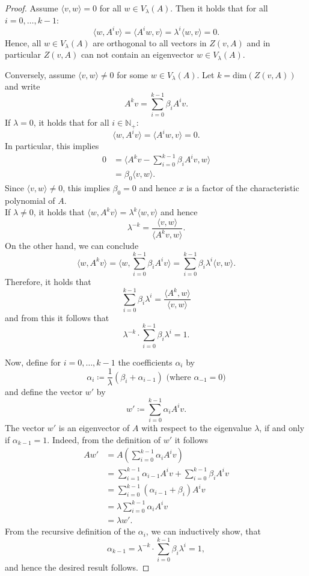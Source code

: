 \documentclass[a4paper,12pt]{article}
\begin{document}
\begin{proof}
Assume $\langle v, w \rangle = 0$ for all $w \in V_\lambda(A)$. Then it holds that for all $i = 0, \ldots, k-1$:
$$ \langle w, A^i v \rangle = \langle A^i w, v \rangle = \lambda^i \langle w, v \rangle = 0.$$
Hence, all $w\in V_\lambda(A)$ are orthogonal to all vectors in $Z(v, A)$ and in particular $Z(v,A)$ can not contain an eigenvector $w \in V_\lambda(A)$.

Conversely, assume $\langle v, w \rangle \neq 0$ for some $w\in V_\lambda(A)$. Let $k = \textrm{dim}(Z(v,A))$ and write
$$A^k v = \sum_{i=0}^{k-1} \beta_iA^i v.$$
If $\lambda = 0$, it holds that for all $i \in \mathbb{N}_+$:
$$\langle w, A^i v \rangle = \langle A^i w, v \rangle = 0.$$
In particular, this implies
\begin{align*}
0 &= \langle A^kv - \sum_{i=0}^{k-1}\beta_iA^iv, w \rangle\\
&= \beta_0\langle v, w\rangle.
\end{align*}
Since $\langle v, w \rangle \neq 0$, this implies $\beta_0 = 0$ and hence $x$ is a factor of the characteristic polynomial of $A$.\\
If $\lambda \neq 0$, it holds that $\langle w, A^kv \rangle = \lambda^k \langle w, v \rangle$ and hence
$$
\lambda^{-k} = \frac {\langle v, w \rangle}{\langle A^kv, w \rangle}.
$$
On the other hand, we can conclude
$$
\langle w, A^k v \rangle = \langle w, \sum_{i=0}^{k-1}\beta_iA^iv\rangle = \sum_{i=0}^{k-1}\beta_i\lambda^i\langle v, w\rangle.
$$
Therefore, it holds that
$$
\sum_{i=0}^{k-1}\beta_i\lambda^i = \frac {\langle A^k, w \rangle}{\langle v, w \rangle}
$$
and from this it follows that
$$
\lambda^{-k} \cdot \sum_{i=0}^{k-1}\beta_i\lambda^i = 1.
$$

Now, define for $i = 0, \ldots, k-1$ the coefficients $\alpha_i$ by
$$ \alpha_i \coloneqq \frac 1 \lambda \left(\beta_i + \alpha_{i-1}\right) \text{ (where $\alpha_{-1} = 0$)} $$
and define the vector $w'$ by
$$w' \coloneqq \sum_{i=0}^{k-1}\alpha_i A^i v.$$
The vector $w'$ is an eigenvector of $A$ with respect to the eigenvalue $\lambda$, if and only if $\alpha_{k-1} = 1$. Indeed, from the definition of $w'$ it follows
\begin{align*}
Aw' &= A \left(\sum_{i=0}^{k-1}\alpha_i A^i v\right)\\
&= \sum_{i=1}^{k-1} \alpha_{i-1}A^iv + \sum_{i=0}^{k-1}\beta_iA^iv\\
&= \sum_{i=0}^{k-1} \left(\alpha_{i-1} + \beta_i\right)A^iv\\
&= \lambda \sum_{i=0}^{k-1} \alpha_iA^iv\\
&= \lambda w'.
\end{align*}
From the recursive definition of the $\alpha_i$, we can inductively show, that
$$ \alpha_{k-1} = \lambda^{-k}  \cdot \sum_{i=0}^{k-1}\beta_i\lambda^i = 1, $$
and hence the desired result follows.


\end{proof}
\end{document}
